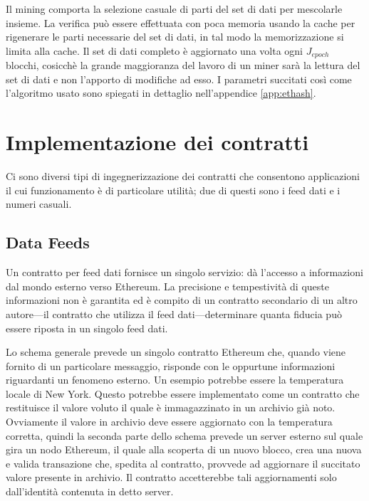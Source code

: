 \documentclass[9pt,oneside]{amsart}
\begin{document}
\begin{multicols}{2}
Il mining comporta la selezione casuale di parti del set di dati per mescolarle insieme. La verifica può essere effettuata con poca memoria usando la cache per rigenerare le parti necessarie del set di dati, in tal modo la memorizzazione si limita alla cache. Il set di dati completo è aggiornato una volta ogni $J_{epoch}$ blocchi, cosicchè la grande maggioranza del lavoro di un miner sarà la lettura del set di dati e non l'apporto di modifiche ad esso. I parametri succitati così come l'algoritmo usato sono spiegati in dettaglio nell'appendice \ref{app:ethash}.

\section{Implementazione dei contratti}

Ci sono diversi tipi di ingegnerizzazione dei contratti che consentono applicazioni il cui funzionamento è di particolare utilità; due di questi sono i feed dati e i numeri casuali. 

\subsection{Data Feeds}
Un contratto per feed dati fornisce un singolo servizio: dà l'accesso a informazioni dal mondo esterno verso Ethereum. La precisione e tempestività di queste informazioni non è garantita ed è compito di un contratto secondario di un altro autore---il contratto che utilizza il feed dati---determinare quanta fiducia può essere riposta in un singolo feed dati.

Lo schema generale prevede un singolo contratto Ethereum che, quando viene fornito di un particolare  messaggio, risponde con le oppurtune informazioni riguardanti un fenomeno esterno. Un esempio potrebbe essere la temperatura locale di New York. Questo potrebbe essere implementato come un contratto che restituisce il valore voluto il quale è immagazzinato in un archivio già noto. Ovviamente il valore in archivio deve essere aggiornato con la temperatura corretta, quindi la seconda parte dello schema prevede un server esterno sul quale gira un nodo Ethereum, il quale alla scoperta di un nuovo blocco, crea una nuova e valida transazione che, spedita al contratto, provvede ad aggiornare il succitato valore presente in archivio. Il contratto accetterebbe tali aggiornamenti solo dall'identità contenuta in detto server.


\end{multicols}
\end{document}
